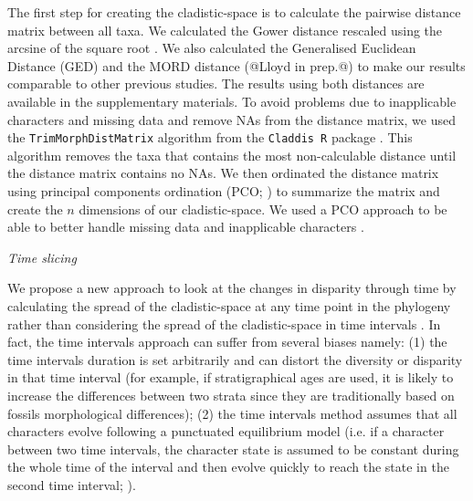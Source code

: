 \documentclass[12pt,letterpaper]{article}
\renewcommand{\subsection}[1]{%
\bigskip
\begin{center}
\begin{large}
\normalfont\itshape #1
\end{large}
\end{center}}
\begin{document}
The first step for creating the cladistic-space is to calculate the pairwise distance matrix between all taxa. We calculated the Gower distance \citep{Gower71} rescaled using the arcsine of the square root \citep{Claddis}. We also calculated the Generalised Euclidean Distance (GED) \cite{Wills2001} and the MORD distance (@Lloyd in prep.@) to make our results comparable to other previous studies. The results using both distances are available in the supplementary materials. To avoid problems due to inapplicable characters and missing data and remove NAs from the distance matrix, we used the \texttt{TrimMorphDistMatrix} algorithm from the \texttt{Claddis R} package \citep{Claddis}. This algorithm removes the taxa that contains the most non-calculable distance until the distance matrix contains no NAs. We then ordinated the distance matrix using principal components ordination (PCO; \citealt{GOWER01121966}) to summarize the matrix and create the $n$ dimensions of our cladistic-space. We used a PCO approach to be able to better handle missing data and inapplicable characters \cite{lofgren2003,Wesley-Hunt2005}.

\subsection{Time slicing}
We propose a new approach to look at the changes in disparity through time by calculating the spread of the cladistic-space at any time point in the phylogeny rather than considering the spread of the cladistic-space in time intervals \citep[e.g.][]{Brusatte12092008,brusattedinosaur2012,toljagictriassic-jurassic2013}. In fact, the time intervals approach can suffer from several biases namely: (1) the time intervals duration is set arbitrarily and can distort the diversity or disparity in that time interval (for example, if stratigraphical ages are used, it is likely to increase the differences between two strata since they are traditionally based on fossils morphological differences); (2) the time intervals method assumes that all characters evolve following a punctuated equilibrium model (i.e. if a character between two time intervals, the character state is assumed to be constant during the whole time of the interval and then evolve quickly to reach the state in the second time interval; \citealt{Gould1977}).
\end{document}
